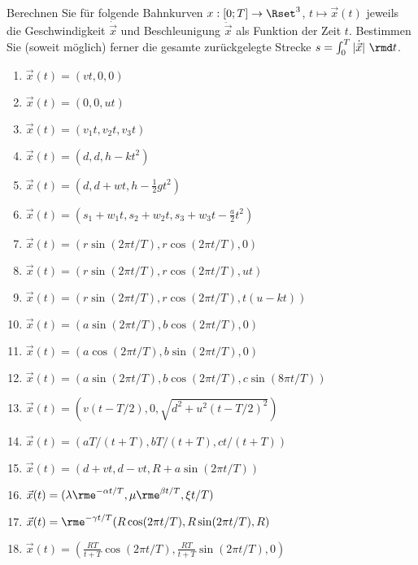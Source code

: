 
Berechnen Sie für folgende Bahnkurven $x:[0;T]\to\Rset^3$,
$t\mapsto\vec{x}(t)$ jeweils die Geschwindigkeit $\dot{\vec{x}}$ und
Beschleunigung $\ddot{\vec{x}}$ als Funktion der Zeit $t$.
Bestimmen Sie (soweit möglich) ferner die gesamte zurückgelegte Strecke
$s=\int_0^T |\dot{\vec{x}}|~\rmd t$.\\
\parbox{0.5\textwidth}{\begin{enumerate}
\item $\vec{x}(t)=(vt,0,0)$
\item $\vec{x}(t)=(0,0,ut)$
\item $\vec{x}(t)=(v_1t,v_2t,v_3t)$
\item $\vec{x}(t)=(d,d,h-kt^2)$
\item $\vec{x}(t)=(d,d+wt,h-\frac{1}{2}gt^2)$
\item $\vec{x}(t)=(s_1+w_1t,s_2+w_2t,s_3+w_3t-\frac{a}{2}t^2)$
\item $\vec{x}(t)=(r\sin(2\pi t/T),r\cos(2\pi t/T),0)$
\item $\vec{x}(t)=(r\sin(2\pi t/T),r\cos(2\pi t/T),ut)$
\item $\vec{x}(t)=(r\sin(2\pi t/T),r\cos(2\pi t/T),t(u-kt))$
\end{enumerate}}\parbox{0.5\textwidth}{\begin{enumerate}\setcounter{enumi}{9}
\item $\vec{x}(t)=(a\sin(2\pi t/T),b\cos(2\pi t/T),0)$
\item $\vec{x}(t)=(a\cos(2\pi t/T),b\sin(2\pi t/T),0)$
\item $\vec{x}(t)=(a\sin(2\pi t/T),b\cos(2\pi t/T),c\sin(8\pi t/T))$
\item $\vec{x}(t)=(v(t-T/2),0,\sqrt{d^2+u^2(t-T/2)^2})$
\item $\vec{x}(t)=(aT/(t+T),bT/(t+T),ct/(t+T))$
\item $\vec{x}(t)=(d+vt,d-vt,R+a\sin(2\pi t/T))$
\item $\vec{x}(t)=(\lambda\rme^{-\alpha t/T},\mu\rme^{\beta t/T},\xi t/T)$
\item $\vec{x}(t)=\rme^{-\gamma t/T}(R\cos(2\pi t/T),R\sin(2\pi t/T),R)$
\item $\vec{x}(t)=(\frac{RT}{t+T}\cos(2\pi t/T),\frac{RT}{t+T}\sin(2\pi t/T),0)$
\end{enumerate}}




